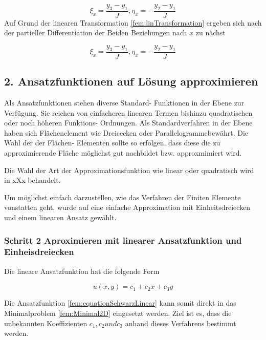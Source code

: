 \begin{equation}
			\xi_x = \frac{y_3 - y_1}{J}, \eta_x = -\frac{y_2 - y_1}{J}
			\label{fem:newKoordinate}
\end{equation}
Auf Grund der linearen Transformation \ref{fem:linTransformation} ergeben sich nach der partieller Differentiation der Beiden Beziehungen nach $x$ zu nächst

\begin{equation}
			\xi_x = \frac{y_3 - y_1}{J}, \eta_x = -\frac{y_2 - y_1}{J}
			\label{fem:newKoordinate}
\end{equation}


\subsection{ 2. Ansatzfunktionen auf Lösung approximieren}

Als Ansatzfunktionen stehen diverse Standard- Funktionen in der Ebene zur Verfügung. Sie reichen von einfacheren linearen Termen bishinzu quadratischen oder noch höheren Funktions- Ordnungen. Als Standardverfahren in der Ebene haben sich Flächenelement wie Dreicecken oder Parallelogrammebewährt. Die Wahl der  der Flächen- Elementen sollte so erfolgen, dass diese die zu approximierende Fläche möglichst gut nachbildet bzw. approxmimiert wird.

Die Wahl der Art der Approximationsfunktion wie linear oder quadratisch wird in xXx behandelt.

Um möglichst einfach darzustellen, wie das Verfahren der Finiten Elemente vonstatten geht, wurde auf eine einfache Approximation mit Einheitsdreiecken und einem linearen Ansatz gewählt. 


\subsubsection{Schritt 2 Aproximieren mit linearer Ansatzfunktion und Einheisdreiecken
\label{fem:subsection:bonorum}}

Die lineare Ansatzfunktion hat die folgende Form

\begin{equation}
u(x,y) = c_1 + c_2x + c_3y
\label{fem:equationSchwarzLinear}
\end{equation}

Die Ansatzfunktion \ref{fem:equationSchwarzLinear} kann somit direkt in das Minimalproblem \ref{fem:Minimal2D} eingesetzt werden. Ziel ist es, dass die unbekannten Koeffizienten $c_1, c_2 und c_3$ anhand dieses Verfahrens bestimmt werden.

